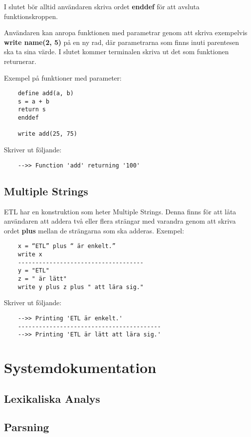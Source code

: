 \documentclass{TDP019mall}
\begin{document}
\begin{enumerate}
I slutet bör alltid användaren skriva ordet \textbf{enddef} för att avsluta funktionskroppen. 
 
Användaren kan anropa funktionen med parametrar genom att skriva exempelvis \textbf{write name(2, 5)} på en ny rad, där parametrarna 
som finns inuti parentesen ska ta sina värde. I slutet kommer terminalen skriva ut det som funktionen returnerar.  
 
 
Exempel på funktioner med parameter:
\begin{verbatim}
    define add(a, b)
    s = a + b
    return s
    enddef

    write add(25, 75)
\end{verbatim}
Skriver ut följande:
\begin{verbatim}
    -->> Function 'add' returning '100'
\end{verbatim}
\end{enumerate}



\subsection{Multiple Strings}
ETL har en konstruktion som heter Multiple Strings. Denna finns för att låta användaren att addera två eller flera strängar med 
varandra genom att skriva ordet \textbf{plus} mellan de strängarna som ska adderas.
Exempel: 
\begin{verbatim}
    x = “ETL” plus “ är enkelt.”
    write x
    ------------------------------------
    y = "ETL"
    z = " är lätt"
    write y plus z plus " att lära sig."
\end{verbatim}
 
Skriver ut följande:
\begin{verbatim}
    -->> Printing 'ETL är enkelt.'
    -----------------------------------------
    -->> Printing 'ETL är lätt att lära sig.'
\end{verbatim}




\section{Systemdokumentation}

\subsection{Lexikaliska Analys}

\subsection{Parsning}
\end{document}
